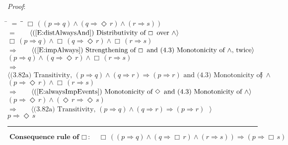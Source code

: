 \documentclass[12pt, fleqn, leqno]{article}
\newcommand{\lgap}{2pt}                             %
\newcommand{\mymathindent}{24pt}                    %
\newcommand{\impl}{\ensuremath{\Rightarrow}}        %
\newcommand{\Event}{\Diamond\,}
\newcommand{\Always}{\Box\,}
\newcommand{\myqed}{\rule[-.23ex]{1.2ex}{2.0ex}}
\newcommand{\myqedtab}{\hspace{384pt}}              %
\newcommand{\Gll} {\langle}                         %
\newcommand{\Ggg} {\rangle}                         %
\newcommand{\Hint}[1]     {\ \ \ $\Gll              \mbox{#1} \Ggg$ }   %
\begin{document}
\emph{Proof}:
\begin{tabbing}
\hspace{\mymathindent} \= $= \;$ \= \myqedtab \= \kill
  \> \>   $\Always ( (p \impl q) \land (q \impl \Event r) \land (r \impl s))$\\[\lgap]
   \> $=$  \>  \Hint{(\ref{E:distAlwaysAnd}) Distributivity of $\Always$ over $\land$}\\[\lgap]
  \> \>   $\Always ( p \impl q) \land \Always (q \impl \Event r) \land \Always (r \impl s)$\\[\lgap]
   \> $\impl$  \>  \Hint{(\ref{E:impAlways}) Strengthening of $\Always$ and (4.3) Monotonicity of $\land$, twice}\\[\lgap]
    \> \>   $ (p \impl q) \land (q \impl \Event r) \land \Always (r \impl s)$\\[\lgap]
    \> $\impl$  \>  \Hint{(3.82a) Transitivity, $(p\impl q) \land (q\impl r) \impl (p\impl r)$ and (4.3) Monotonicity of $\land$}\\[\lgap]
     \> \>   $ (p \impl \Event r) \land \Always (r \impl s)$\\[\lgap]
     \> $\impl$ \> \Hint{(\ref{E:alwaysImpEvents}) Monotonicity of $\Event$ and (4.3) Monotonicity of $\land$} \\[\lgap]
  \> \>   $ (p \impl \Event r) \land (\Event r \impl \Event s)$\\[\lgap]
  \> $\impl$  \>  \Hint{(3.82a) Transitivity, $(p\impl q) \land (q\impl r) \impl (p\impl r)$ }\\[\lgap]
  \> \>   $ p \impl \Event s$\quad \myqed
\end{tabbing}
\begin{equation}\label{E:AlwaysConRule}
\textbf{Consequence rule of $\Always$:}\quad \Always ( (p \impl q) \land (q \impl \Always r) \land (r \impl s)) \impl (p \impl \Always s)
\end{equation}
\end{document}
